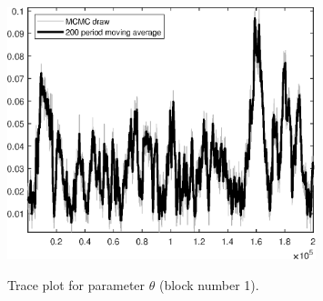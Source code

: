 \begin{figure}[H]
\centering
  \includegraphics[width=0.8\textwidth]{RBC_growth/graphs/TracePlot_theta_blck_1}\\
    \caption{Trace plot for parameter ${\theta}$ (block number 1).}
\end{figure}
